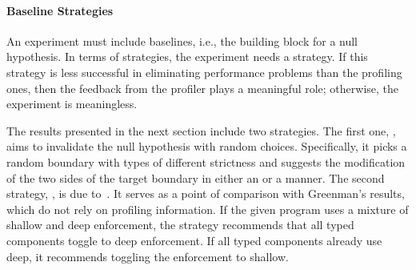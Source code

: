 \paragraph{Baseline Strategies} An experiment must include baselines, i.e., the
 building block for a null hypothesis. In terms of strategies, the experiment
 needs a \agnostickw{} strategy.  If this \agnostickw{} strategy is less
 successful in eliminating performance problems than the profiling ones, then
 the feedback from the profiler plays a meaningful role; otherwise, the
 experiment is meaningless.

The results presented in the next section include two 
 \agnostickw{} strategies. The first one, \randkw{}, aims to invalidate the null
 hypothesis with random choices. Specifically, it picks a random boundary with
 types of different strictness and suggests the modification of the two sides of the
 target boundary in either an \optkw{} or a \conkw{} manner.  The second
 \agnostickw{} strategy, \togglekw{}, is due to~\citet{g-deep-shallow}. It
 serves as a point of comparison with Greenman's results, which do not rely on
 profiling information. If the given program uses a mixture of shallow and deep
 enforcement, the strategy recommends that all
 typed components toggle to deep enforcement. If all typed components already use deep, it
 recommends toggling the enforcement to shallow.
